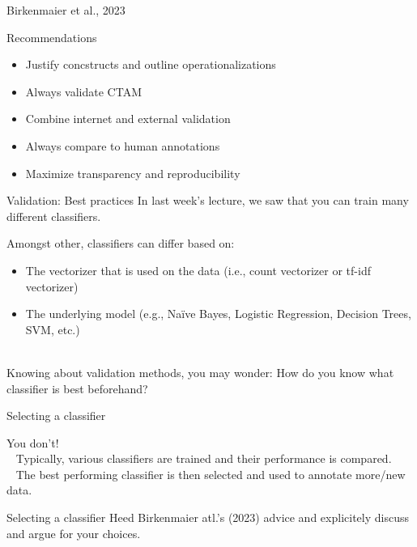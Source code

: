 \documentclass[compress]{beamer}
\begin{document}

\begin{frame}{Birkenmaier et al., 2023}
	\begin{alertblock}{Recommendations}
		\begin{itemize}
			\item Justify concstructs and outline operationalizations
			\item Always validate CTAM
			\item Combine internet and external validation
			\item Always compare to human annotations
			\item Maximize transparency and reproducibility 
		\end{itemize}
	\end{alertblock}
\end{frame}


\begin{frame}{Validation: Best practices}
In last week's lecture, we saw that you can train many different classifiers.  

\begin{alertblock}{Amongst other, classifiers can differ based on:}
	\begin{itemize}
		\item The vectorizer that is used on the data (i.e., count vectorizer or tf-idf vectorizer)
		\item The underlying model (e.g., Naïve Bayes, Logistic Regression, Decision Trees, SVM, etc.)\\\
	\end{itemize}
\end{alertblock}
\pause
Knowing about validation methods, you may wonder:
How do you know what classifier is best beforehand?
\end{frame}


\begin{frame}{Selecting a classifier}

You don't!\\\
\pause
Typically, various classifiers are trained and their performance is compared.\\\
\pause
The best performing classifier is then selected and used to annotate more/new data.
\end{frame}


\begin{frame}{Selecting a classifier}
Heed Birkenmaier atl.'s (2023) advice and explicitely discuss and argue for your choices.
\end{frame}
\end{document}
